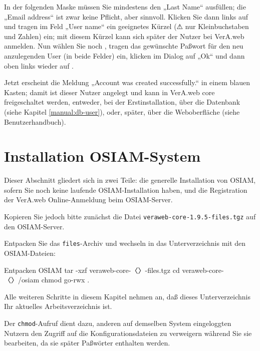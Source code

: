 \documentclass{tarentanleitung}
\newcommand{\vwiaverssw}{1.9.5}
\begin{document}
In der folgenden Maske müssen Sie mindestens den „Last Name“ ausfüllen;
die „Email address“ ist zwar keine Pflicht, aber sinnvoll.
Klicken Sie dann links auf  und tragen im Feld
„User name“ ein geeignetes Kürzel (⚠ nur Kleinbuchstaben und Zahlen) ein;
mit diesem Kürzel kann sich später der Nutzer bei VerA.web anmelden. Nun
wählen Sie noch , tragen das gewünschte
Paßwort für den neu anzulegenden User (in beide Felder) ein, klicken im
Dialog auf „Ok“ und dann oben links wieder auf .

Jetzt erscheint die Meldung „Account was created successfully.“ in einem
blauen Kasten; damit ist dieser Nutzer angelegt und kann in VerA.web core
freigeschaltet werden, entweder, bei der Erstinstallation, über die
Datenbank (siehe Kapitel \ref{manual:db-user}), oder, später, über die
Weboberfläche (siehe Benutzerhandbuch).

\section{Installation OSIAM-System}\label{sec:setup-osiam}

Dieser Abschnitt gliedert sich in zwei Teile: die generelle Installation
von OSIAM, sofern Sie noch keine laufende OSIAM-Installation haben, und
die Registration der VerA.web Online-Anmeldung beim OSIAM-Server.

Kopieren Sie jedoch bitte zunächst die Datei
\texttt{veraweb-core-\vwiaverssw{}-files.tgz}
auf den OSIAM-Server.

\begin{minipage}{\linewidth}
Entpacken Sie das \texttt{files}-Archiv und wechseln in das
Unterverzeichnis mit den OSIAM-Dateien:

\begin{lstdump}{Entpacken OSIAM}
tar -xzf veraweb-core-〈\lstdumpesc{\vwiaverssw}〉-files.tgz
cd veraweb-core-〈\lstdumpesc{\vwiaverssw}〉/osiam
chmod go-rwx .
\end{lstdump}
\end{minipage}

Alle weiteren Schritte in diesem Kapitel nehmen an, daß dieses
Unterverzeichnis Ihr aktuelles Arbeitsverzeichnis ist.

Der \texttt{chmod}-Aufruf dient dazu, anderen auf demselben System
eingeloggten Nutzern den Zugriff auf die Konfigurationsdateien zu
verweigern während Sie sie bearbeiten, da sie später Paßwörter
enthalten werden.
\end{document}
